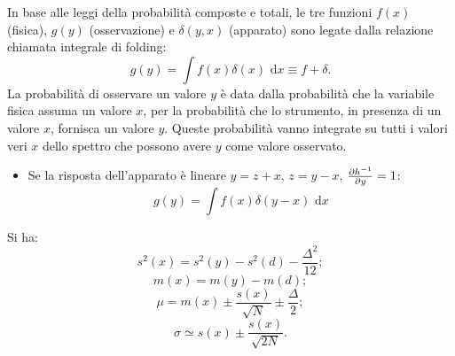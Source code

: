 In base alle leggi della probabilità composte e totali, le tre funzioni $f(x)$ (fisica), $g(y)$ (osservazione) e $\delta(y,x)$ (apparato) sono legate dalla relazione chiamata integrale di folding:
\[
g\left( y \right) =\int { f\left( x \right) \delta \left( x \right) \textrm{ d}x } \equiv f+\delta .
\]
La probabilità di osservare un valore $y$ è data dalla probabilità che la variabile fisica assuma un valore $x$, per la probabilità che lo strumento, in presenza di un valore $x$, fornisca un valore $y$. Queste probabilità vanno integrate su tutti i valori veri $x$ dello spettro che possono avere $y$ come valore osservato.
\begin{itemize}
\item Se la risposta dell'apparato è lineare $y=z+x$, $z=y-x$, $\frac { \partial { h }^{ -1 } }{ \partial y } =1\\ $:
\[
g\left( y \right) =\int { f\left( x \right) \delta \left( y-x \right) \textrm{ d}x } 
\]
\end{itemize}

Si ha:
\begin{equation}
{ s }^{ 2 }\left( x \right) ={ s }^{ 2 }\left( y \right) -{ s }^{ 2 }\left( d \right) -\frac { { \Delta  }^{ 2 } }{ 12 } ;
\end{equation}
\begin{equation}
m\left( x \right) =m\left( y \right) -m\left( d \right) ;
\end{equation}
\begin{equation}
\mu =m\left( x \right) \pm \frac { s\left( x \right)  }{ \sqrt { N }  } \pm \frac { \Delta  }{ 2 } ;
\end{equation}
\begin{equation}
\sigma \simeq s\left( x \right) \pm \frac { s\left( x \right)  }{ \sqrt { 2N }  } .
\end{equation}